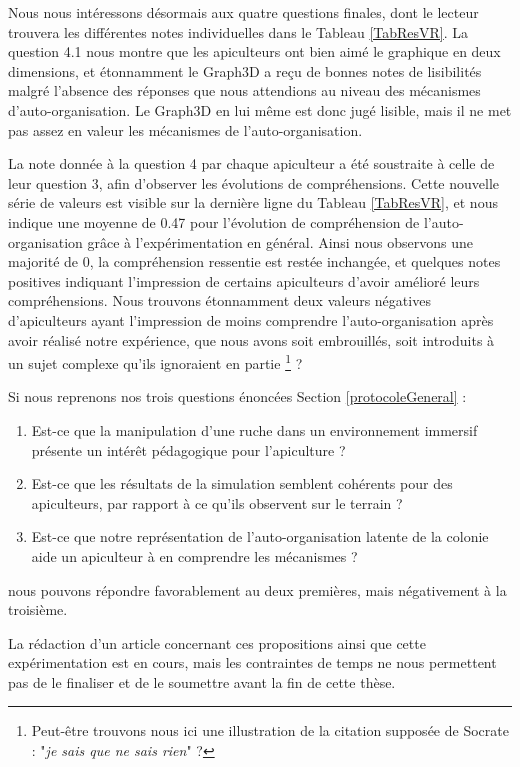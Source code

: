 	Nous nous intéressons désormais aux quatre questions finales, dont le lecteur trouvera les différentes notes individuelles dans le Tableau \ref{TabResVR}. La question 4.1 nous montre que les apiculteurs ont bien aimé le graphique en deux dimensions, et étonnamment le Graph3D a reçu de bonnes notes de lisibilités malgré l'absence des réponses que nous attendions au niveau des mécanismes d'auto-organisation. Le Graph3D en lui même est donc jugé lisible, mais il ne met pas assez en valeur les mécanismes de l'auto-organisation. 
	
	La note donnée à la question 4 par chaque apiculteur a été soustraite à celle de leur question 3, afin d'observer les évolutions de compréhensions. Cette nouvelle série de valeurs est visible sur la dernière ligne du Tableau \ref{TabResVR}, et nous indique une moyenne de 0.47 pour l'évolution de compréhension de l'auto-organisation grâce à l'expérimentation en général. 
	Ainsi nous observons une majorité de 0, la compréhension ressentie est restée inchangée, et quelques notes positives indiquant l'impression de certains apiculteurs d'avoir amélioré leurs compréhensions. Nous trouvons étonnamment deux valeurs négatives d'apiculteurs ayant l'impression de moins comprendre l'auto-organisation après avoir réalisé notre expérience, que nous avons soit embrouillés, soit introduits à un sujet complexe qu'ils ignoraient en partie \footnote{Peut-être trouvons nous ici une illustration de la citation supposée de Socrate : "\textit{je sais que ne sais rien}" ?} ?
	
	Si nous reprenons nos trois questions énoncées Section \ref{protocoleGeneral} : 
		\begin{enumerate}
			\item Est-ce que la manipulation d'une ruche dans un environnement immersif présente un intérêt pédagogique pour l'apiculture ?
			\item Est-ce que les résultats de la simulation semblent cohérents pour des apiculteurs, par rapport à ce qu'ils observent sur le terrain ?
			\item Est-ce que notre représentation de l'auto-organisation latente de la colonie aide un apiculteur à en comprendre les mécanismes ?
		\end{enumerate}	
	 nous pouvons répondre favorablement au deux premières, mais négativement à la troisième.
	 
	 La rédaction d'un article concernant ces propositions ainsi que cette expérimentation est en cours, mais les contraintes de temps ne nous permettent pas de le finaliser et de le soumettre avant la fin de cette thèse.
		
